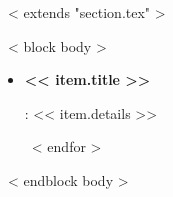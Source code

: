 ~< extends "section.tex" >~

~< block body >~

  \begin{itemize}
  ~< for item in items >~
  
     \item
     \begin{small} \textbf{<< item.title >>} \end{small}:
      << item.details >>
    
  ~< endfor >~
  \end{itemize}
~< endblock body >~
